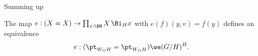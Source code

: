 Summing up
\begin{lemma}
  \label{lem:WGHisHfixofG/H}
  The map  $e:(X=X)\to \prod_{x:\BH}X\, \Bi_Hx$ with $e(f)(y,v)=f(y)$ defines an equivalence
$$e:(\pt_{W_GH}=\pt_{W_GH})\we (G/H)^H.$$
\end{lemma}



